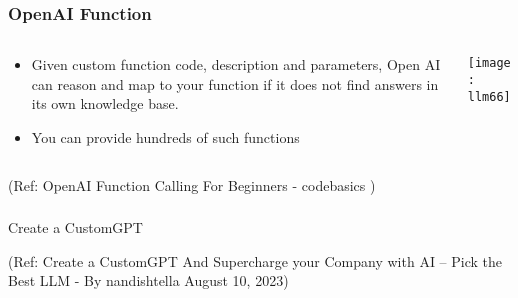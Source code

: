 \begin{frame}[fragile]\frametitle{OpenAI Function }

\begin{columns}
    \begin{column}[T]{0.6\linewidth}
      \begin{itemize}
		\item Given custom function code, description and parameters, Open AI can reason and map to your function if it does not find answers in its own knowledge base.
		\item You can provide hundreds of such functions
	  \end{itemize}

    \end{column}
    \begin{column}[T]{0.4\linewidth}
\begin{center}
\texttt{[image: llm66]}
\end{center}
    \end{column}
  \end{columns}

{\tiny (Ref: OpenAI Function Calling For Beginners - codebasics )}

\end{frame}

\begin{frame}[fragile]\frametitle{}
\begin{center}
{\Large Create a CustomGPT}
\end{center}

{\tiny (Ref: Create a CustomGPT And Supercharge your Company with AI  –  Pick the Best LLM - By nandishtella  August 10, 2023)}

\end{frame}

